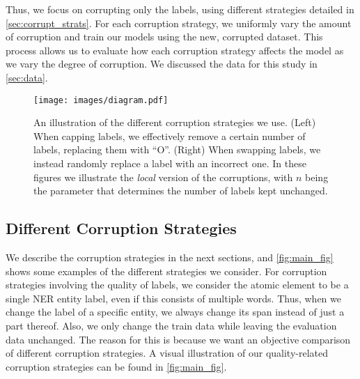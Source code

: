 \documentclass{article}
\newcommand{\mike}[1]{\textcolor{red}{#1}}
\begin{document}
Thus, we focus on corrupting only the labels, using different strategies detailed in \autoref{sec:corrupt_strats}. For each corruption strategy, we uniformly vary the amount of corruption and train our models using the new, corrupted dataset. This process allows us to evaluate how each corruption strategy affects the model as we vary the degree of corruption. We discussed the data for this study in \autoref{sec:data}.
 

\begin{figure*}
    \centering
    \texttt{[image: images/diagram.pdf]}
    \caption{An illustration of the different corruption strategies we use. (Left) When capping labels, we effectively remove a certain number of labels, replacing them with ``O''. (Right) When swapping labels, we instead randomly replace a label with an incorrect one. In these figures we illustrate the \textit{local} version of the corruptions, with $n$ being the parameter that determines the number of labels kept unchanged.}
    \label{fig:main_fig}
\end{figure*}


\subsection{Different Corruption Strategies}
\label{sec:corrupt_strats}
We describe the corruption strategies in the next sections, and \autoref{fig:main_fig} shows some examples of the different strategies we consider. For corruption strategies involving the quality of labels, we consider the atomic element to be a single NER entity label, even if this consists of multiple words. Thus, when we change the label of a specific entity, we always change its span instead of just a part thereof. Also, we only change the train data while leaving the evaluation data unchanged. The reason for this is because we want an objective comparison of different corruption strategies. A visual illustration of our quality-related corruption strategies can be found in \autoref{fig:main_fig}.
\end{document}
